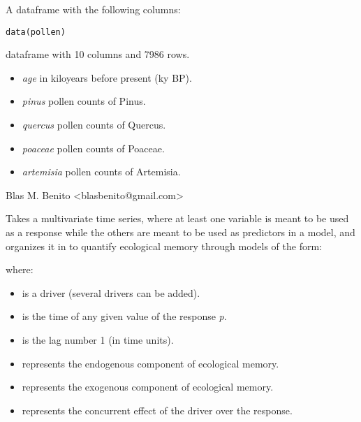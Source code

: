 \documentclass[letterpaper]{book}
\begin{document}
%
\begin{Description}\relax
A dataframe with the following columns:
\end{Description}
%
\begin{Usage}
\begin{verbatim}
data(pollen)
\end{verbatim}
\end{Usage}
%
\begin{Format}
dataframe with 10 columns and 7986 rows.
\end{Format}
%
\begin{Details}\relax
\begin{itemize}

\item \emph{age} in kiloyears before present (ky BP).
\item \emph{pinus} pollen counts of Pinus.
\item \emph{quercus} pollen counts of Quercus.
\item \emph{poaceae} pollen counts of Poaceae.
\item \emph{artemisia} pollen counts of Artemisia.

\end{itemize}

\end{Details}
%
\begin{Author}\relax
Blas M. Benito  <blasbenito@gmail.com>
\end{Author}
%
\begin{Description}\relax
Takes a multivariate time series, where at least one variable is meant to be used as a response while the others are meant to be used as predictors in a model, and organizes it in to quantify ecological memory through models of the form:

where:

\begin{itemize}

\item {} is a driver (several drivers can be added).
\item {} is the time of any given value of the response \emph{p}.
\item {} is the lag number 1 (in time units).
\item {}  represents the endogenous component of ecological memory.
\item {}  represents the exogenous component of ecological memory.
\item {} represents the concurrent effect of the driver over the response.

\end{itemize}

\end{Description}
\end{document}
